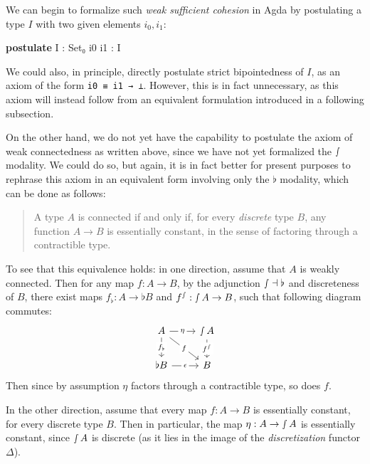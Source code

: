 \documentclass[
  12pt]{article}
\newenvironment{Shaded}{\begin{snugshade}}{\end{snugshade}}
\newcommand{\DataTypeTok}[1]{\textcolor[rgb]{0.00,0.34,0.68}{#1}}
\newcommand{\KeywordTok}[1]{\textcolor[rgb]{0.12,0.11,0.11}{\textbf{#1}}}
\newcommand{\NormalTok}[1]{\textcolor[rgb]{0.12,0.11,0.11}{#1}}
\newcommand{\OtherTok}[1]{\textcolor[rgb]{0.00,0.43,0.16}{#1}}
\begin{document}
We can begin to formalize such \emph{weak sufficient cohesion} in Agda
by postulating a type \(I\) with two given elements \(i_0,i_1\):

\begin{Shaded}
\begin{Highlighting}[]
\KeywordTok{postulate}
\NormalTok{    I }\OtherTok{:} \DataTypeTok{Set₀}
\NormalTok{    i0 i1 }\OtherTok{:}\NormalTok{ I}
\end{Highlighting}
\end{Shaded}

We could also, in principle, directly postulate strict bipointedness of
\(I\), as an axiom of the form \texttt{i0\ ≡\ i1\ →\ ⊥}. However, this
is in fact unnecessary, as this axiom will instead follow from an
equivalent formulation introduced in a following subsection.

On the other hand, we do not yet have the capability to postulate the
axiom of weak connectedness as written above, since we have not yet
formalized the \(\smallint\) modality. We could do so, but again, it is
in fact better for present purposes to rephrase this axiom in an
equivalent form involving only the \(\flat\) modality, which can be done
as follows:

\begin{quote}
A type \(A\) is connected if and only if, for every \emph{discrete} type
\(B\), any function \(A \to B\) is essentially constant, in the sense of
factoring through a contractible type.
\end{quote}

To see that this equivalence holds: in one direction, assume that \(A\)
is weakly connected. Then for any map \(f : A \to B\), by the adjunction
\(\smallint \dashv \flat\) and discreteness of \(B\), there exist maps
\(f_\flat : A \to \flat B\) and \(f^\smallint : \smallint A \to B\),
such that following diagram commutes: \[
\begin{tikzcd}
    {A} & {\smallint A} \\
    {\flat B} & B
    \arrow["{f_\flat}"{description}, from=1-1, to=2-1]
    \arrow["{f^\smallint}"{description}, from=1-2, to=2-2]
    \arrow["{\epsilon}"{description}, from=2-1, to=2-2]
    \arrow["{\eta}"{description}, from=1-1, to=1-2]
    \arrow["f"{description}, from=1-1, to=2-2]
\end{tikzcd}
\] Then since by assumption \(\eta\) factors through a contractible
type, so does \(f\).

In the other direction, assume that every map \(f : A \to B\) is
essentially constant, for every discrete type \(B\). Then in particular,
the map \(\eta : A \to \smallint A\) is essentially constant, since
\(\smallint A\) is discrete (as it lies in the image of the
\emph{discretization} functor \(\Delta\)).
\end{document}
